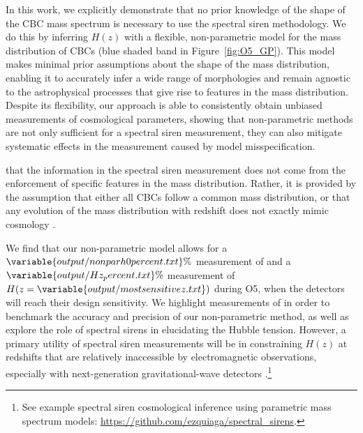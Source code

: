 \documentclass[preprint2,linenumbers]{aastex631}
\begin{document}
In this work, we explicitly demonstrate that no prior knowledge of the shape of the \ac{CBC} mass spectrum is necessary to use the spectral siren methodology. 
We do this by inferring $H(z)$ with a flexible, non-parametric model for the mass distribution of \acp{CBC} (blue shaded band in Figure~\ref{fig:O5_GP}). 
This model makes minimal prior assumptions about the shape of the mass distribution, enabling it to accurately infer a wide range of morphologies and remain agnostic to the astrophysical processes that give rise to features in the mass distribution.
Despite its flexibility, our approach is able to consistently obtain unbiased measurements of cosmological parameters, showing that non-parametric methods are not only sufficient for a spectral siren measurement, they can also mitigate systematic effects in the measurement caused by model misspecification.

 that the information in the spectral siren measurement does not come from the enforcement of specific features in the mass distribution.
Rather, it is provided by the assumption that either all \acp{CBC} follow a common mass distribution, or that any evolution of the mass distribution with redshift does not exactly mimic cosmology \citep{ezquiaga_spectral_2022}.

We find that our non-parametric model allows for a $\variable{output/nonparh0percent.txt}\%$ measurement of \Ho{} and a $\variable{output/Hz_percent.txt}\%$ measurement of $H(z=\variable{output/mostsensitivez.txt})$ during \ac{O5}, when the detectors will reach their design sensitivity. 
We highlight measurements of \Ho{}  in order to benchmark the accuracy and precision of our non-parametric method, as well as explore the role of spectral sirens in elucidating the Hubble tension.
However, a primary utility of spectral siren measurements will be in constraining $H(z)$  at redshifts that are relatively inaccessible by electromagnetic observations, especially with next-generation gravitational-wave detectors \citep{You:2020wju, Ezquiaga:2020tns, ezquiaga_spectral_2022, Chen:2024gdn}.\footnote{See example spectral siren cosmological inference using parametric mass spectrum models: \href{https://github.com/ezquiaga/spectral_sirens}{https://github.com/ezquiaga/spectral\_sirens}.}
\end{document}
